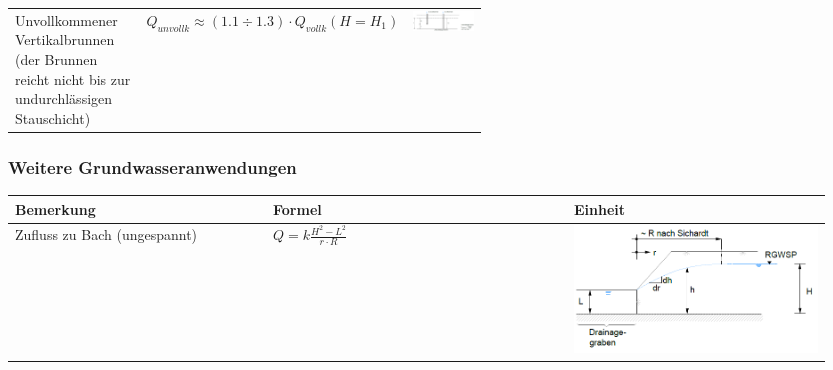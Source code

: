 \begin{landscape}
\begin{minipage}{0.6\linewidth}
\begin{tabular}{p{0.3\linewidth}|l|p{0.25\linewidth}}
			Unvollkommener Vertikalbrunnen (der Brunnen reicht nicht bis zur undurchlässigen Stauschicht)	& $ Q_{unvollk} \approx (1.1 \div 1.3) \cdot Q_{vollk} (H = H_1) $	& \smallskip \includegraphics[width=\linewidth]{images/GW11gespAquiferunvollk.PNG}  \\
						
		\end{tabular}
	\end{minipage}
	\begin{minipage}{0.4\linewidth}
		
		\subsubsection{Weitere Grundwasseranwendungen}
		
		\begin{tabular}{p{0.3\linewidth}|p{0.35\linewidth}|p{0.3\linewidth}}
			Bemerkung 		& Formel			&	Einheit \\ \hline
			
			Zufluss zu Bach (ungespannt) & $ Q = k \frac{H^2 - L^2}{r \cdot R} $	& \smallskip \includegraphics[width=\linewidth]{images/GW12Bachungespannt.PNG}  \\ \hline
			

\end{tabular}
\end{minipage}
\end{landscape}
